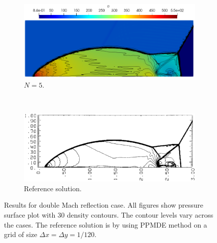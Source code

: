 \documentclass[a4paper,11pt,oneside]{article}
\newcommand{\citear}[1]{\citeauthor{#1} \cite{#1}} %
\begin{document}
\begin{figure}[htbp]
\begin{subfigure}{0.5\linewidth}
		\includegraphics[width=\linewidth]{figures/dmr/res_60_N5_chandrashekhar}
		\caption{$N=5$.}
		\label{subfig:dmr_result_N5}
	\end{subfigure}\\
	\begin{subfigure}{0.5\linewidth}
		\includegraphics[width=\linewidth]{figures/dmr/woodward_rho_contour}
		\caption{Reference solution.}
		\label{subfig:dmr_woodward_rho_contour}
	\end{subfigure}
	\caption{Results for double Mach reflection case. All figures show pressure surface plot with 30 density contours. The contour levels vary across the cases. The reference solution is by \citear{woodwardColella1984} using PPMDE method on a grid of size $\Delta x = \Delta y = 1/120$.}
    \label{fig:dmr_results}
\end{figure}

\printbibliography
\end{document}

